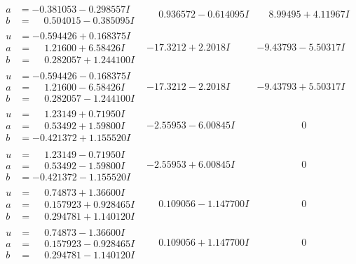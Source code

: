 \documentclass[1p]{elsarticle_modified}
\theoremstyle{definition}
\begin{document}
$$\begin{array}{c|c|c}
\begin{aligned}
a &= -0.381053 - 0.298557 I \\
b &= \phantom{-}0.504015 - 0.385095 I\end{aligned}
 & \phantom{-}0.936572 - 0.614095 I & \phantom{-}8.99495 + 4.11967 I \\ \hline\begin{aligned}
u &= -0.594426 + 0.168375 I \\
a &= \phantom{-}1.21600 + 6.58426 I \\
b &= \phantom{-}0.282057 + 1.244100 I\end{aligned}
 & -17.3212 + 2.2018 I & -9.43793 - 5.50317 I \\ \hline\begin{aligned}
u &= -0.594426 - 0.168375 I \\
a &= \phantom{-}1.21600 - 6.58426 I \\
b &= \phantom{-}0.282057 - 1.244100 I\end{aligned}
 & -17.3212 - 2.2018 I & -9.43793 + 5.50317 I \\ \hline\begin{aligned}
u &= \phantom{-}1.23149 + 0.71950 I \\
a &= \phantom{-}0.53492 + 1.59800 I \\
b &= -0.421372 + 1.155520 I\end{aligned}
 & -2.55953 - 6.00845 I & \phantom{-0.000000 } 0 \\ \hline\begin{aligned}
u &= \phantom{-}1.23149 - 0.71950 I \\
a &= \phantom{-}0.53492 - 1.59800 I \\
b &= -0.421372 - 1.155520 I\end{aligned}
 & -2.55953 + 6.00845 I & \phantom{-0.000000 } 0 \\ \hline\begin{aligned}
u &= \phantom{-}0.74873 + 1.36600 I \\
a &= \phantom{-}0.157923 + 0.928465 I \\
b &= \phantom{-}0.294781 + 1.140120 I\end{aligned}
 & \phantom{-}0.109056 - 1.147700 I & \phantom{-0.000000 } 0 \\ \hline\begin{aligned}
u &= \phantom{-}0.74873 - 1.36600 I \\
a &= \phantom{-}0.157923 - 0.928465 I \\
b &= \phantom{-}0.294781 - 1.140120 I\end{aligned}
 & \phantom{-}0.109056 + 1.147700 I & \phantom{-0.000000 } 0 \\ \hline\begin{aligned}

\end{aligned}
\end{array}$$
\end{document}
